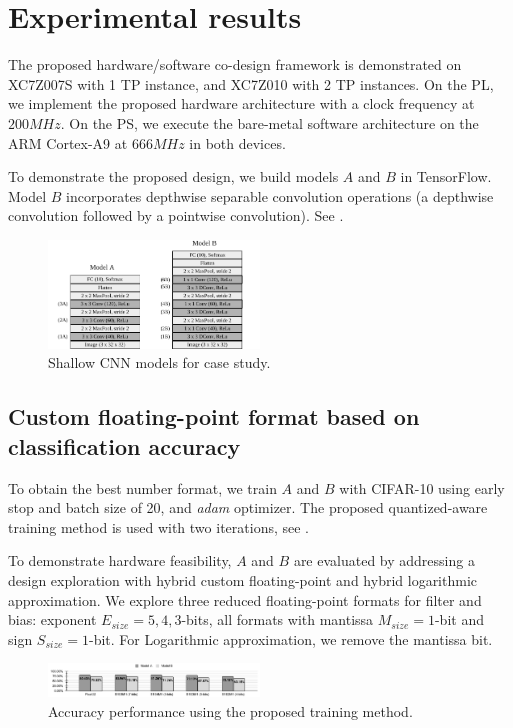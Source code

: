 \section{Experimental results}
\label{sec:experimental_results}
The proposed hardware/software co-design framework is demonstrated on XC7Z007S with 1 TP instance, and XC7Z010 with 2 TP instances. On the PL, we implement the proposed hardware architecture with a clock frequency at $200 MHz$. On the PS, we execute the bare-metal software architecture on the ARM Cortex-A9 at $666MHz$ in both devices.

To demonstrate the proposed design, we build models $A$ and $B$ in TensorFlow. Model $B$ incorporates depthwise separable convolution operations (a depthwise convolution followed by a pointwise convolution). See .

\begin{figure}[t!]
	\centering
	\includegraphics[width=0.5\textwidth]{../figures/models.pdf}
	\caption{Shallow CNN models for case study.}
	\label{fig:models}
\end{figure}

\subsection{Custom floating-point format based on classification accuracy}
To obtain the best number format, we train $A$ and $B$ with CIFAR-10 using early stop and batch size of 20, and \emph{adam} optimizer. The proposed quantized-aware training method is used with two iterations, see .

To demonstrate hardware feasibility, $A$ and $B$ are evaluated by addressing a design exploration with hybrid custom floating-point and hybrid logarithmic approximation. We explore three reduced floating-point formats for filter and bias: exponent $E_{size} = 5, 4, 3$-bits, all formats with mantissa $M_{size} = 1$-bit and sign $S_{size} = 1$-bit. For Logarithmic approximation, we remove the mantissa bit.

\begin{figure}[t!]
	\centering
	\includegraphics[width=0.5\textwidth]{../figures/all_models_accuracy.pdf}
	\caption{Accuracy performance using the proposed training method.}
	\label{fig:accuracy}
\end{figure}


